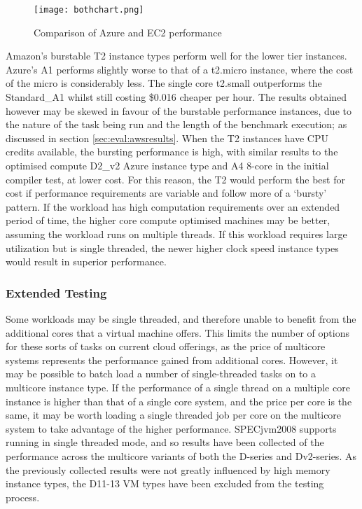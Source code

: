 \documentclass[conference]{IEEEtran}
\begin{document}
\begin{figure}[ht]
  \centering
  \texttt{[image: bothchart.png]}
  \caption{Comparison of Azure and EC2 performance}
  \label{fig:bothchart}
\end{figure}

Amazon's burstable T2 instance types perform well for the lower tier instances. Azure's A1 performs slightly worse to that of a t2.micro instance, where the cost of the micro is considerably less. The single core t2.small outperforms the Standard\_A1 whilst still costing \$0.016 cheaper per hour. The results obtained however may be skewed in favour of the burstable performance instances, due to the nature of the task being run and the length of the benchmark execution; as discussed in section \ref{sec:eval:awsresults}. When the T2 instances have CPU credits available, the bursting performance is high, with similar results to the optimised compute D2\_v2 Azure instance type and A4 8-core in the initial compiler test, at lower cost. For this reason, the T2 would perform the best for cost if performance requirements are variable and follow more of a `bursty' pattern. If the workload has high computation requirements over an extended period of time, the higher core compute optimised machines may be better, assuming the workload runs on multiple threads. If this workload requires large utilization but is single threaded, the newer higher clock speed instance types would result in superior performance.

\subsubsection{Extended Testing}\label{sec:eval:extended}

Some workloads may be single threaded, and therefore unable to benefit from the additional cores that a virtual machine offers. This limits the number of options for these sorts of tasks on current cloud offerings, as the price of multicore systems represents the performance gained from additional cores. However, it may be possible to batch load a number of single-threaded tasks on to a multicore instance type. If the performance of a single thread on a multiple core instance is higher than that of a single core system, and the price per core is the same, it may be worth loading a single threaded job per core on the multicore system to take advantage of the higher performance. SPECjvm2008 supports running in single threaded mode\cite{specjvmguide}, and so results have been collected of the performance across the multicore variants of both the D-series and Dv2-series. As the previously collected results were not greatly influenced by high memory instance types, the D11-13 VM types have been excluded from the testing process.
\end{document}
